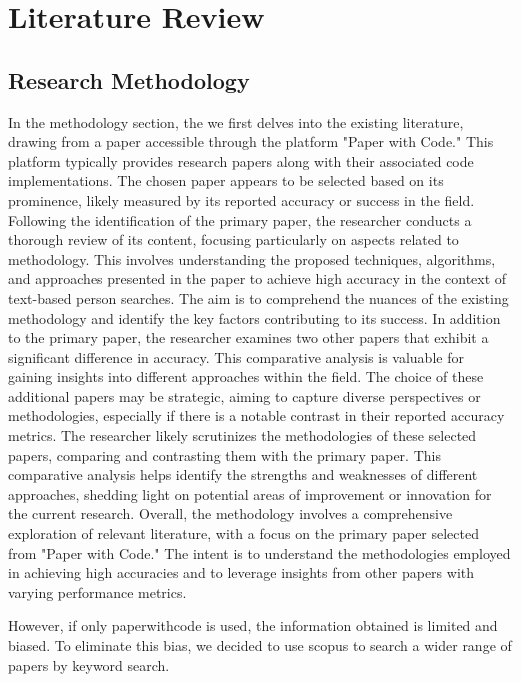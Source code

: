 \chapter{Literature Review}


\section{Research Methodology}
In the methodology section, the we first delves into the existing literature, drawing from a paper accessible through the platform "Paper with Code." This platform typically provides research papers along with their associated code implementations. The chosen paper appears to be selected based on its prominence, likely measured by its reported accuracy or success in the field.
Following the identification of the primary paper, the researcher conducts a thorough review of its content, focusing particularly on aspects related to methodology. This involves understanding the proposed techniques, algorithms, and approaches presented in the paper to achieve high accuracy in the context of text-based person searches. The aim is to comprehend the nuances of the existing methodology and identify the key factors contributing to its success.
In addition to the primary paper, the researcher examines two other papers that exhibit a significant difference in accuracy. This comparative analysis is valuable for gaining insights into different approaches within the field. The choice of these additional papers may be strategic, aiming to capture diverse perspectives or methodologies, especially if there is a notable contrast in their reported accuracy metrics.
The researcher likely scrutinizes the methodologies of these selected papers, comparing and contrasting them with the primary paper. This comparative analysis helps identify the strengths and weaknesses of different approaches, shedding light on potential areas of improvement or innovation for the current research.
Overall, the methodology involves a comprehensive exploration of relevant literature, with a focus on the primary paper selected from "Paper with Code." The intent is to understand the methodologies employed in achieving high accuracies and to leverage insights from other papers with varying performance metrics. 

However, if only paperwithcode is used, the information obtained is limited and biased. To eliminate this bias, we decided to use scopus to search a wider range of papers by keyword search.

